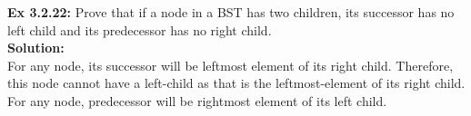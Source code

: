 \documentclass[11pt,fleqn]{article}
\begin{document}
\textbf{Ex 3.2.22:} Prove that if a node in a BST has two children, its successor has no left child and
its predecessor has no right child.\\
	
\textbf{Solution:}\\
For any node, its successor will be leftmost element of its right child. Therefore, this node cannot have a left-child as that is the leftmost-element of its right child.\\

For any node, predecessor will be rightmost element of its left child.
\end{document}
